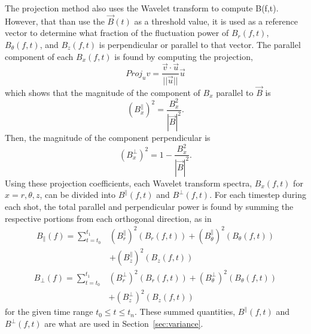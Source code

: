 \documentclass[aip,prl,amsmath,amssymb,reprint,superscriptaddress]{revtex4-1} %
\begin{document}
The projection method also uses the Wavelet transform to compute B(f,t). However, that than use the $\vec{B}(t)$ as a threshold value, it is used as a reference vector to determine what fraction of the fluctuation power of $B_{r}(f,t)$, $B_{\theta}(f,t)$, and $B_{z}(f,t)$ is perpendicular or parallel to that vector. The parallel component of each $B_{x}(f,t)$ is found by computing the projection,
\begin{equation}
Proj_{u}v = \frac{\vec{v} \cdot \vec{u}}{||\vec{u}||}\vec{u}
\label{eq:projection}
\end{equation}
which shows that the magnitude of the component of $B_{x}$ parallel to $\vec{B}$ is
\begin{equation}
(B_{x}^{\parallel})^{2} = \frac{B^{2}_{x}}{|\vec{B}|^{2}}.
\label{eq:para_mag}
\end{equation}
Then, the magnitude of the component perpendicular is
\begin{equation}
(B_{x}^{\perp})^2 = 1 - \frac{B^{2}_{x}}{|\vec{B}|^{2}}.
\label{eq:perp_mag}
\end{equation}
Using these projection coefficients, each Wavelet transform spectra, $B_{x}(f,t)$ for $x = r,\theta,z$, can be divided into $B^{\parallel}(f,t)$ and $B^{\perp}(f,t)$. For each timestep during each shot, the total parallel and perpendicular power is found by summing the respective portions from each orthogonal direction, as in
\begin{equation}
\begin{split}
B_{\parallel}(f) = \sum_{t=t_{0}}^{t_{1}} &(B_{r}^{\parallel})^{2}(B_{r}(f,t))+(B_{\theta}^{\parallel})^{2}(B_{\theta}(f,t))\\
																					&+(B_{z}^{\parallel})^{2}(B_{z}(f,t))
\label{eq:Bparallel}
\end{split}
\end{equation}
\begin{equation}
\begin{split}
B_{\perp}(f) = \sum_{t=t_{0}}^{t_{1}} &(B_{r}^{\perp})^{2}(B_{r}(f,t))+(B_{\theta}^{\perp})^{2}(B_{\theta}(f,t))\\
																					&+(B_{z}^{\perp})^{2}(B_{z}(f,t))
\label{eq:Bperp}
\end{split}
\end{equation}
for the given time range $t_{0}\leq t \leq t_{n}$. These summed quantities, $B^{\parallel}(f,t)$ and $B^{\perp}(f,t)$ are what are used in Section~\ref{sec:variance}.
\end{document}
